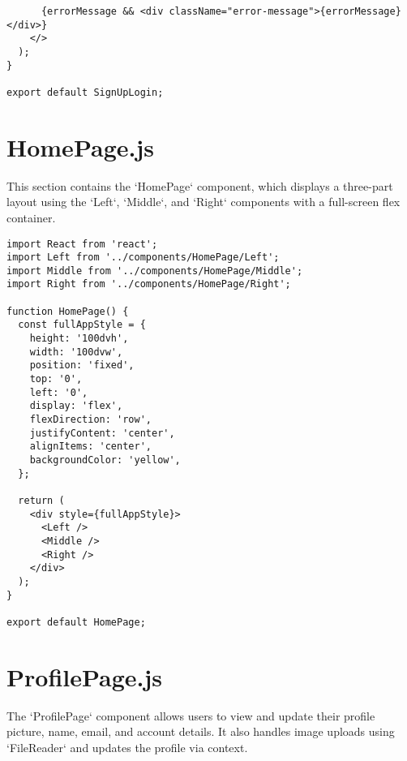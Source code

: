 \documentclass[12pt,a4paper]{report}
\begin{document}
\begin{lstlisting}
      {errorMessage && <div className="error-message">{errorMessage}</div>}
    </>
  );
}

export default SignUpLogin;
\end{lstlisting}


\section{HomePage.js}

This section contains the `HomePage` component, which displays a three-part layout using the `Left`, `Middle`, and `Right` components with a full-screen flex container.


\begin{lstlisting}
import React from 'react';
import Left from '../components/HomePage/Left';
import Middle from '../components/HomePage/Middle';
import Right from '../components/HomePage/Right';

function HomePage() {
  const fullAppStyle = {
    height: '100dvh',
    width: '100dvw',
    position: 'fixed',
    top: '0',
    left: '0',
    display: 'flex',
    flexDirection: 'row',
    justifyContent: 'center',
    alignItems: 'center',
    backgroundColor: 'yellow',
  };

  return (
    <div style={fullAppStyle}>
      <Left />
      <Middle />
      <Right />
    </div>
  );
}

export default HomePage;
\end{lstlisting}


\section{ProfilePage.js}

The `ProfilePage` component allows users to view and update their profile picture, name, email, and account details. It also handles image uploads using `FileReader` and updates the profile via context.

\end{document}
